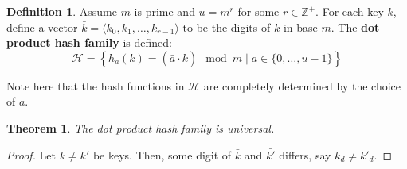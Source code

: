 \documentclass[11pt]{article}
\theoremstyle{plain}
\newtheorem{thm}{Theorem}
\theoremstyle{definition}
\newtheorem*{defn}{Definition}
\newcommand{\Z}{\mathbb{Z}}
\begin{document}
\begin{defn}
    Assume $m$ is prime and $u = m^r$ for some $r \in \Z^+$. For each key $k$, define a vector 
    $\bar{k} = \langle k_0, k_1, \ldots, k_{r-1}\rangle$ to be the digits of $k$ in base $m$. 
    The \textbf{dot product hash family} is defined:
    $$\mathcal{H} = \left\{ h_a(k) = (\bar{a} \cdot \bar{k})\mod m \mid a \in \{0, \ldots, u-1\}\right\}$$
\end{defn}

Note here that the hash functions in $\mathcal{H}$ are completely determined by the choice of $a$. 

\begin{thm}
    The dot product hash family is universal.
\end{thm}

\begin{proof}
    Let $k \neq k'$ be keys. Then, some digit of $\bar{k}$ and $\bar{k'}$ differs, say $k_d \neq k'_d$.
\end{proof}




 
\end{document}
